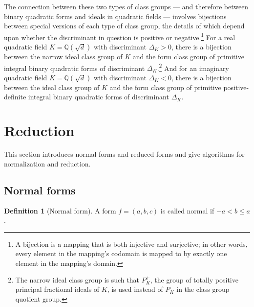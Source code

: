 \documentclass{article}
\theoremstyle{definition}
\newtheorem{definition}{Definition}[section]
\theoremstyle{theorem}
\theoremstyle{example}
\theoremstyle{corollary}
\begin{document}
The connection between these two types of class groups --- and therefore between binary quadratic forms and ideals in quadratic fields --- involves bijections between special versions of each type of class group, the details of which depend upon whether the discriminant in question is positive or negative.\footnote{A bijection is a mapping that is both injective and surjective; in other words, every element in the mapping's codomain is mapped to by exactly one element in the mapping's domain.} For a real quadratic field \(K = \mathbb{Q}(\sqrt{d})\) with discriminant \(\Delta_{K} > 0\), there is a bijection between the narrow ideal class group of \(K\) and the form class group of primitive integral binary quadratic forms of discriminant \(\Delta_{K}\).\footnote{The narrow ideal class group is such that \(P_{K}^{+}\), the group of totally positive principal fractional ideals of \(K\), is used instead of \(P_{K}\) in the class group quotient group.} And for an imaginary quadratic field \(K = \mathbb{Q}(\sqrt{d})\) with discriminant \(\Delta_{K} < 0\), there is a bijection between the ideal class group of \(K\) and the form class group of primitive positive-definite integral binary quadratic forms of discriminant \(\Delta_{K}\).







\bigskip








\section{Reduction}

\bigskip

This section introduces normal forms and reduced forms and give algorithms for normalization and reduction.

\bigskip

\subsection{Normal forms}

\bigskip

\theoremstyle{definition}
\begin{definition}[Normal form]
A form \(f = (a, b, c)\) is called normal if \(-a < b \le a\).
\end{definition}

\bigskip
\end{document}
